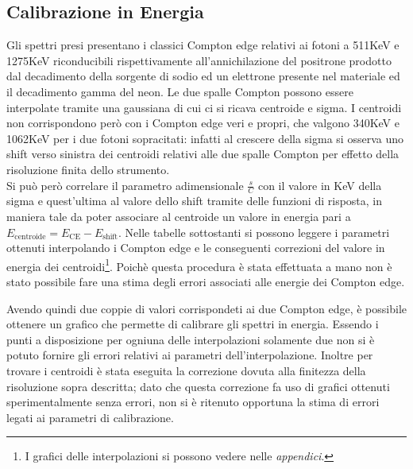 \subsection{Calibrazione in Energia}
Gli spettri presi presentano i classici Compton edge relativi ai fotoni a 511KeV e 1275KeV riconducibili rispettivamente
all'annichilazione del positrone prodotto dal decadimento della sorgente di sodio ed un elettrone presente nel materiale ed il decadimento gamma del neon. Le due spalle Compton possono
essere interpolate tramite una gaussiana di cui ci si ricava centroide e sigma. I centroidi non corrispondono però con i Compton edge veri e propri, che valgono
340KeV e 1062KeV per i due fotoni sopracitati: infatti al crescere della sigma si osserva uno shift verso sinistra dei centroidi relativi alle due spalle Compton
per effetto della risoluzione finita dello strumento. \\
Si può però correlare il parametro adimensionale \(\frac{s}{C}\) con il valore in KeV della sigma e quest'ultima al valore dello shift tramite delle funzioni di 
risposta, in maniera tale da poter associare al centroide un valore in energia pari a \(E_{\text{centroide}} = E_{\text{CE}} - E_{\text{shift}}\).  Nelle tabelle
sottostanti si possono leggere i parametri ottenuti interpolando i Compton edge e le conseguenti correzioni del valore in energia dei centroidi\footnote{I grafici
delle interpolazioni si possono vedere nelle \textit{appendici}.}. Poichè questa procedura è stata effettuata a mano non è stato possibile fare una stima degli errori 
associati alle energie dei Compton edge.


%
\begin{tabella}[h]
	\centering
	
	\caption{Procedura calibrazione del rivelatore 1}
	\label{tab:calib_shift_1}
\end{tabella}
%
%
\begin{tabella}[h]
	\centering
	
	\caption{Procedura calibrazione del rivelatore 2}
	\label{tab:calib__shift_2}
\end{tabella}
%
Avendo quindi due coppie di valori corrispondeti ai due Compton edge, è possibile ottenere un grafico che permette di calibrare gli spettri in energia.
Essendo i punti a disposizione per ogniuna delle interpolazioni solamente due non si è potuto fornire gli errori relativi ai parametri dell'interpolazione. Inoltre per
trovare i centroidi è stata eseguita la correzione dovuta alla finitezza della risoluzione sopra descritta; dato che questa correzione fa uso di grafici ottenuti
sperimentalmente senza errori, non si è ritenuto opportuna la stima di errori legati ai parametri di calibrazione.


